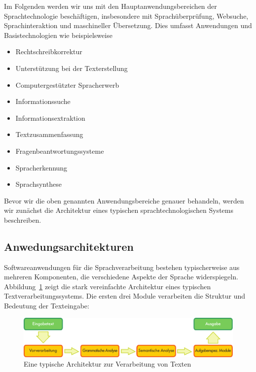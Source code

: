 \documentclass[]{../../metanetpaper}
\begin{document}
\begin{multicols}{2}
Im Folgenden werden wir uns mit den Hauptanwendungsbereichen der Sprachtechnologie beschäftigen, insbesondere mit Sprachüberprüfung, Websuche, Sprach\-inter\-aktion und maschineller Übersetzung. Dies umfasst Anwendungen und Basistechnologien wie beispielsweise

\begin{itemize}
\item Rechtschreibkorrektur
\item Unterstützung bei der Texterstellung
\item Computergestützter Spracherwerb
\item Informationssuche
\item Informationsextraktion
\item Textzusammenfassung
\item Fragenbeantwortungssysteme
\item Spracherkennung 
\item Sprachsynthese
\end{itemize}

Bevor wir die oben genannten Anwendungsbereiche genauer behandeln, werden wir zunächst die Architektur eines typischen sprachtechnologischen Systems beschreiben. 

\subsection{Anwedungsarchitekturen}

Softwareanwendungen für die Sprachverarbeitung bestehen typischerweise aus mehreren Komponenten, die verschiedene Aspekte der Sprache widerspiegeln. Abbildung~\ref{fig:textprocessingarch_de} zeigt die stark vereinfachte Architektur eines typischen Textverarbeitungssystems. Die ersten drei Module verarbeiten die Struktur und Bedeutung der Texteingabe:

\begin{figure}[htb]
  \center
  \vspace{-5mm} \includegraphics[width=\textwidth]{../_media/german/text_processing_app_architecture}
  \caption{Eine typische Architektur zur Verarbeitung von Texten}
  \label{fig:textprocessingarch_de}
\end{figure}


\end{multicols}
\end{document}
